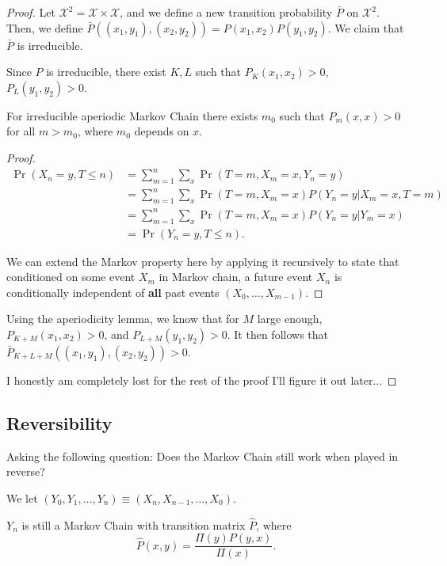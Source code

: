 \documentclass{article}
\begin{document}
\begin{proof} 
	Let $\mathcal{X}^2 = \mathcal{X} \times \mathcal{X}$, and we define a new transition probability $\bar{P}$ on $\mathcal{X}^2$. 
	Then, we define $\bar{P}((x_1, y_1), (x_2, y_2)) = P(x_1, x_2) P(y_1, y_2)$. We claim that $\bar{P}$ is irreducible.

	Since $P$ is irreducible, there exist $K, L$ such that $P_K(x_1, x_2) > 0$, $P_L(y_1, y_2) > 0$. 

	\begin{lemma}
		For irreducible aperiodic Markov Chain there exists $m_0$ such that $P_m(x, x) > 0$ for all $m > m_0$, where $m_0$ depends on $x$.
	\end{lemma}

	\begin{proof} 
		\begin{align*}
			\Pr(X_n = y, T \leq n) &= \sum_{m = 1}^n \sum_{x} \Pr(T = m, X_m = x, Y_n = y) \\
								   &= \sum_{m = 1}^n \sum_{x} \Pr(T = m, X_m = x) P(Y_n = y | X_m = x, T = m) \\
								   &= \sum_{m = 1}^n \sum_{x} \Pr(T = m, X_m = x) P(Y_n = y | Y_m = x) \\
								   &= \Pr(Y_n = y, T \leq n).
		\end{align*}

		We can extend the Markov property here by applying it recursively to state that conditioned on some event $X_m$ in Markov chain, a future event $X_n$ is conditionally independent of \textbf{all} past events $(X_0, \ldots, X_{m-1})$.
	\end{proof}

	Using the aperiodicity lemma, we know that for $M$ large enough, $P_{K+M}(x_1, x_2) > 0$, and $P_{L+M}(y_1, y_2) > 0$. It then follows that $\bar{P}_{K+L+M}((x_1, y_1), (x_2, y_2)) > 0$.  

	I honestly am completely lost for the rest of the proof I'll figure it out later...
\end{proof}

\subsection{Reversibility}
Asking the following question: Does the Markov Chain still work when played in reverse? 

We let $(Y_0, Y_1, \ldots, Y_n) \equiv (X_n, X_{n-1}, \ldots, X_0)$. 

\begin{lemma} 
	$Y_n$ is still a Markov Chain with transition matrix $\hat{P}$, where 
	\[\hat{P}(x, y) = \frac{\Pi(y) P(y, x)}{\Pi(x)}.\] 
\end{lemma}
\end{document}
